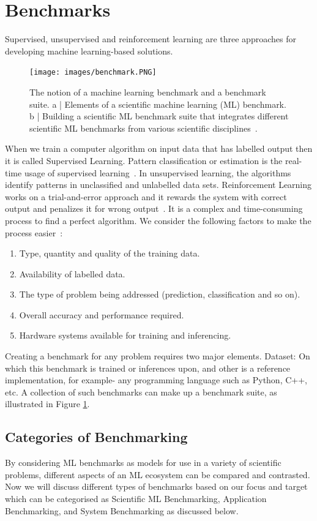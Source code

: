 \documentclass[a4paper,UKenglish,cleveref, autoref, thm-restate]{lipics-v2021}
\begin{document}
\section{Benchmarks}
\label{benchmarks}
 Supervised, unsupervised and reinforcement learning are three approaches for developing machine learning-based solutions.
\begin{figure}[ht]
    \centering
    \texttt{[image: images/benchmark.PNG]}
    \caption{ The notion of a machine learning benchmark and a benchmark suite. a | Elements of
a scientific machine learning (ML) benchmark. b | Building a scientific ML benchmark suite that
integrates different scientific ML benchmarks from various scientific disciplines~\cite{sctmlb}.}
    \label{fig:figure 1}
\end{figure}
When we train a computer algorithm on input data that has labelled output then it is called Supervised Learning. Pattern classification or estimation is the real-time usage of supervised learning~\cite{sctmlb}.  In unsupervised learning, the algorithms identify patterns in unclassified and unlabelled data sets. Reinforcement Learning works on a trial-and-error approach and it rewards the system with correct output and penalizes it for wrong output~\cite{RefWorksreinforcement}.  
It is a complex and time-consuming process to find a perfect algorithm. We consider the following factors to make the process easier~\cite{sctmlb}:
 \begin{enumerate}
\item Type, quantity and quality of the training data.
\item Availability of labelled data.
\item The type of problem being addressed (prediction, classification and so on).
\item Overall accuracy and performance required.
\item Hardware systems available for training and inferencing. 
 \end{enumerate}
Creating a benchmark for any problem requires two major elements. Dataset: On which this benchmark is trained or inferences upon, and other is a reference implementation, for example- any programming language such as Python, C++, etc.  A collection of such benchmarks can make up a benchmark suite, as illustrated in
Figure \ref{fig:figure 1}.

\subsection{Categories of Benchmarking}
\label{categories of benchmarking}
By considering ML benchmarks as models for use in a variety of scientific problems, different aspects of an ML ecosystem can be compared and contrasted. Now we will discuss different types of benchmarks based on our focus and target which can be categorised as Scientific ML Benchmarking, Application Benchmarking, and System Benchmarking as discussed below.
\end{document}
